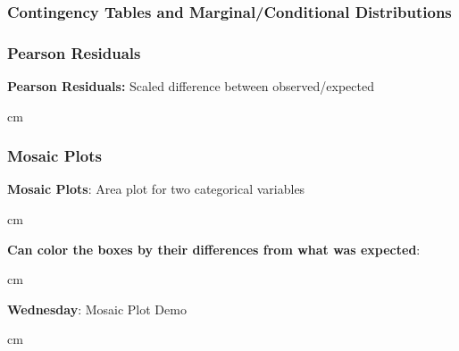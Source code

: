 \documentclass{beamer} %
\begin{document}
\begin{frame}\frametitle{Contingency Tables and Marginal/Conditional Distributions}
	\small
	
	
	
\end{frame}





\begin{frame}\frametitle{Pearson Residuals}
	\small
	
	\textbf{Pearson Residuals:}  Scaled difference between observed/expected%
	
	
	 cm
	
\end{frame}



\begin{frame}\frametitle{Mosaic Plots}
	\small
	
	\textbf{Mosaic Plots}:  Area plot for two categorical variables%
	
	 cm
	
	\textbf{Can color the boxes by their differences from what was expected}:  %
	
	 cm
	
	\textbf{Wednesday}:  Mosaic Plot Demo%
	
	 cm
	
\end{frame}
\end{document}
